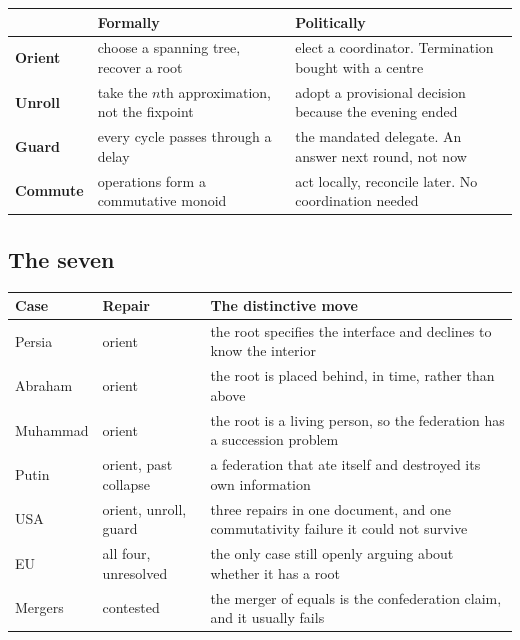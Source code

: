 \documentclass[11pt,a4paper]{article}
\begin{document}
\begin{center}
\begin{tabular}{@{}l@{\hspace{4mm}}>{\raggedright\arraybackslash}p{}@{\hspace{4mm}}>{\raggedright\arraybackslash}p{}@{}}
\toprule
& \textbf{Formally} & \textbf{Politically} \\
\midrule
\textbf{Orient} & choose a spanning tree, recover a root &
  elect a coordinator. Termination bought with a centre \\[1mm]
\textbf{Unroll} & take the $n$th approximation, not the fixpoint &
  adopt a provisional decision because the evening ended \\[1mm]
\textbf{Guard} & every cycle passes through a delay &
  the mandated delegate. An answer next round, not now \\[1mm]
\textbf{Commute} & operations form a commutative monoid &
  act locally, reconcile later. No coordination needed \\
\bottomrule
\end{tabular}
\end{center}

\subsection{The seven}

\begin{center}
\begin{tabular}{@{}l@{\hspace{4mm}}l@{\hspace{4mm}}>{\raggedright\arraybackslash}p{}@{}}
\toprule
\textbf{Case} & \textbf{Repair} & \textbf{The distinctive move} \\
\midrule
Persia    & orient & the root specifies the interface and declines to know the interior \\[1mm]
Abraham   & orient & the root is placed behind, in time, rather than above \\[1mm]
Muhammad  & orient & the root is a living person, so the federation has a succession problem \\[1mm]
Putin     & orient, past collapse & a federation that ate itself and destroyed its own information \\[1mm]
USA       & orient, unroll, guard & three repairs in one document, and one commutativity failure it could not survive \\[1mm]
EU        & all four, unresolved & the only case still openly arguing about whether it has a root \\[1mm]
Mergers   & contested & the merger of equals is the confederation claim, and it usually fails \\
\bottomrule
\end{tabular}
\end{center}
\end{document}
